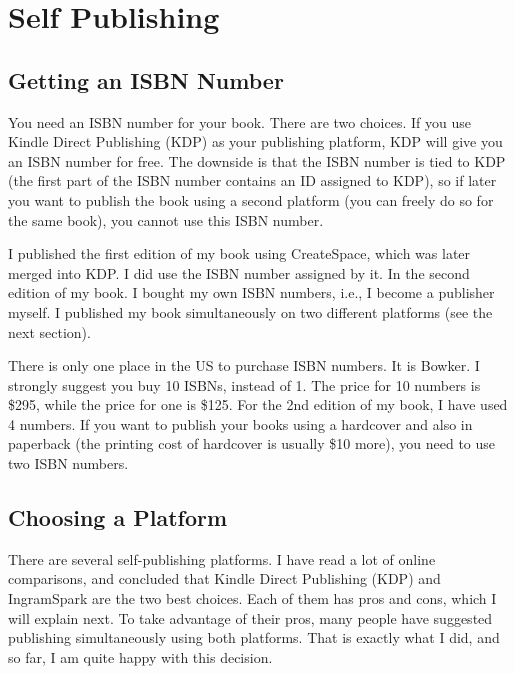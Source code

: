 
\chapter{Self Publishing}
\label{chapter:publishing}

\thispagestyle{empty}


\minitoc
\newpage



\section{Getting an ISBN Number}


You need an ISBN number for your book. There are two choices. 
If you use Kindle Direct Publishing (KDP) as your publishing platform, KDP will give you an
ISBN number for free. The downside is that the ISBN number is tied to KDP (the first part of
the ISBN number contains an ID assigned to KDP), so if later you want to
publish the book using a second platform (you can freely do so for the same book), 
you cannot use this ISBN number. 

I published the first edition of my book using CreateSpace, which was later merged into KDP. I
did use the ISBN number assigned by it. In the second edition of my book. I bought my own ISBN
numbers, i.e., I become a publisher myself. I published my book simultaneously on two different
platforms (see the next section). 

There is only one place in the US to purchase ISBN numbers. It is Bowker. I strongly suggest
you buy 10 ISBNs, instead of 1. The price for 10 numbers is \$295, while the price for one is
\$125. For the 2nd edition of my book, I have used 4 numbers. If you want to publish your books
using a hardcover and also in paperback (the printing cost of hardcover is usually \$10 more), 
you need to use two ISBN numbers.  




\section{Choosing a Platform}


There are several self-publishing platforms. I have read a lot of online comparisons, and
concluded that Kindle Direct Publishing (KDP) and IngramSpark are the two best choices. Each of
them has pros and cons, which I will explain next. To take advantage of their pros, many people
have suggested publishing simultaneously using both platforms. That is exactly what I did, and so far,
I am quite happy with this decision. 


